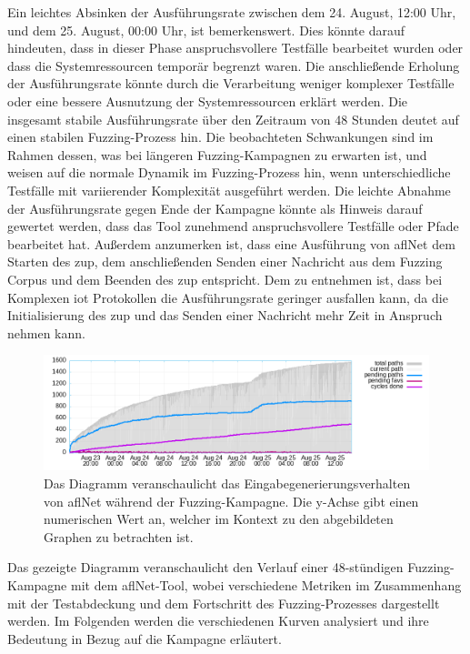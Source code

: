 \noindent Ein leichtes Absinken der Ausführungsrate zwischen dem 24. August, 12:00 Uhr, und dem 25. August, 00:00 Uhr, ist bemerkenswert.
Dies könnte darauf hindeuten, dass in dieser Phase anspruchsvollere Testfälle bearbeitet wurden oder dass die Systemressourcen
temporär begrenzt waren.
Die anschließende Erholung der Ausführungsrate könnte durch die Verarbeitung weniger komplexer Testfälle oder eine bessere
Ausnutzung der Systemressourcen erklärt werden.
Die insgesamt stabile Ausführungsrate über den Zeitraum von 48 Stunden deutet auf einen stabilen Fuzzing-Prozess hin.
Die beobachteten Schwankungen sind im Rahmen dessen, was bei längeren Fuzzing-Kampagnen zu erwarten ist, und weisen auf
die normale Dynamik im Fuzzing-Prozess hin, wenn unterschiedliche Testfälle mit variierender Komplexität ausgeführt werden.
Die leichte Abnahme der Ausführungsrate gegen Ende der Kampagne könnte als Hinweis darauf gewertet werden, dass das Tool
zunehmend anspruchsvollere Testfälle oder Pfade bearbeitet hat.
Außerdem anzumerken ist, dass eine Ausführung von \gls{afl}Net dem Starten des \gls{zup}, dem anschließenden
Senden einer Nachricht aus dem Fuzzing Corpus und dem Beenden des \gls{zup} entspricht.
Dem zu entnehmen ist, dass bei Komplexen \gls{iot} Protokollen die Ausführungsrate geringer ausfallen kann, da die
Initialisierung des \gls{zup} und das Senden einer Nachricht mehr Zeit in Anspruch nehmen kann.
\begin{figure}[H]
    \centering
    \includegraphics[width=\textwidth]{img/high_freq}
    \caption[]{Das Diagramm veranschaulicht das Eingabegenerierungsverhalten von \gls{afl}Net während der Fuzzing-Kampagne.
    Die y-Achse gibt einen numerischen Wert an, welcher im Kontext zu den abgebildeten Graphen zu betrachten ist.}
    \label{fig:aflnet_speed}
\end{figure}
\noindent Das gezeigte Diagramm veranschaulicht den Verlauf einer 48-stündigen Fuzzing-Kampagne mit dem \gls{afl}Net-Tool, wobei
verschiedene Metriken im Zusammenhang mit der Testabdeckung und dem Fortschritt des Fuzzing-Prozesses dargestellt werden.
Im Folgenden werden die verschiedenen Kurven analysiert und ihre Bedeutung in Bezug auf die Kampagne erläutert.\newline\newline
